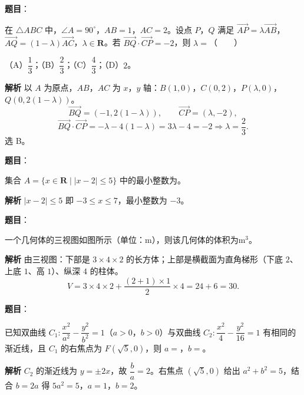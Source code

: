 \begin{answer}

\textbf{题目}：

在 $\triangle ABC$ 中，$\angle A=90^\circ$，$AB=1$，$AC=2$。设点 $P$，$Q$ 满足 $\overrightarrow{AP}=\lambda\overrightarrow{AB}$，$\overrightarrow{AQ}=(1-\lambda)\overrightarrow{AC}$，$\lambda\in\mathbf R$。若 $\overrightarrow{BQ}\cdot\overrightarrow{CP}=-2$，则 $\lambda=$\mbox{（　　）}

（A）$\dfrac13$；（B）$\dfrac23$；（C）$\dfrac43$；（D）$2$。

\textbf{解析}
以 $A$ 为原点，$AB$，$AC$ 为 $x$，$y$ 轴：$B(1,0)$，$C(0,2)$，$P(\lambda,0)$，$Q(0,2(1-\lambda))$。
\nopagebreak[4]
\[\overrightarrow{BQ}=(-1,2(1-\lambda)),\qquad\overrightarrow{CP}=(\lambda,-2),\]
\nopagebreak[4]
\[\overrightarrow{BQ}\cdot\overrightarrow{CP}=-\lambda-4(1-\lambda)=3\lambda-4=-2\Longrightarrow\lambda=\frac23.\]
选 B。


\end{answer}
\begin{answer}

\textbf{题目}：

集合 $A=\{x\in\mathbf R\mid |x-2|\leqslant5\}$ 中的最小整数为\gkblank{}。

\textbf{解析}
$|x-2|\leqslant5$ 即 $-3\leqslant x\leqslant7$，最小整数为 $-3$。


\end{answer}
\begin{answer}

\textbf{题目}：

一个几何体的三视图如图所示（单位：$\mathrm m$），则该几何体的体积为\gkblank{}$\mathrm{m}^3$。
\nopagebreak[4]
\begin{center}\end{center}
\nopagebreak[4]
\textbf{解析}
由三视图：下部是 $3\times4\times2$ 的长方体；上部是横截面为直角梯形（下底 $2$、上底 $1$、高 $1$）、纵深 $4$ 的柱体。
\nopagebreak[4]
\[V=3\times4\times2+\frac{(2+1)\times1}2\times4=24+6=30.\]


\end{answer}
\begin{answer}

\textbf{题目}：

已知双曲线 $C_1:\dfrac{x^2}{a^2}-\dfrac{y^2}{b^2}=1$（$a>0$，$b>0$）与双曲线 $C_2:\dfrac{x^2}4-\dfrac{y^2}{16}=1$ 有相同的渐近线，且 $C_1$ 的右焦点为 $F(\sqrt5,0)$，则 $a=$\gkblank{}，$b=$\gkblank{}。

\textbf{解析}
$C_2$ 的渐近线为 $y=\pm2x$，故 $\dfrac ba=2$。右焦点 $(\sqrt5,0)$ 给出 $a^2+b^2=5$，结合 $b=2a$ 得 $5a^2=5$，$a=1$，$b=2$。


\end{answer}
